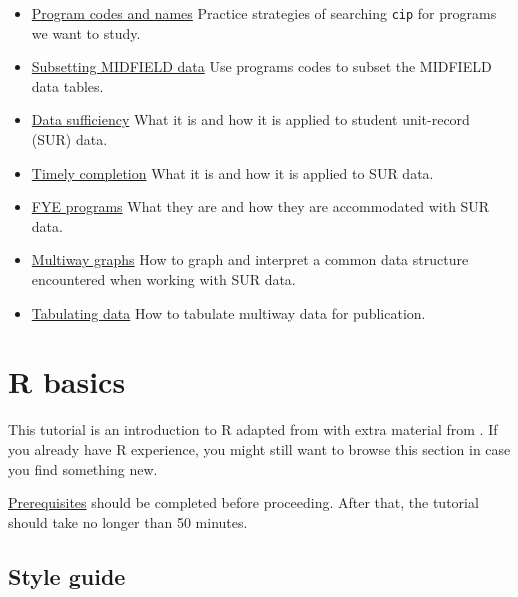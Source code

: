\documentclass[
]{book}
\providecommand{\tightlist}{%
  \setlength{\itemsep}{0pt}\setlength{\parskip}{0pt}}
\begin{document}
\begin{itemize}
\tightlist
\item
  \href{https://midfieldr.github.io/midfieldr/articles/art-010-program-codes.html}{Program codes and names} Practice strategies of searching \texttt{cip} for programs we want to study.
\item
  \href{https://midfieldr.github.io/midfieldr/articles/art-015-subsetting-midfield-data.html}{Subsetting MIDFIELD data} Use programs codes to subset the MIDFIELD data tables.
\item
  \href{https://midfieldr.github.io/midfieldr/articles/art-020-data-sufficiency.html}{Data sufficiency} What it is and how it is applied to student unit-record (SUR) data.
\item
  \href{https://midfieldr.github.io/midfieldr/articles/art-030-timely-completion.html}{Timely completion} What it is and how it is applied to SUR data.
\item
  \href{https://midfieldr.github.io/midfieldr/articles/art-040-fye-programs.html}{FYE programs} What they are and how they are accommodated with SUR data.
\item
  \href{https://midfieldr.github.io/midfieldr/articles/art-050-multiway-graphs.html}{Multiway graphs} How to graph and interpret a common data structure encountered when working with SUR data.
\item
  \href{https://midfieldr.github.io/midfieldr/articles/art-060-tabulating-data.html}{Tabulating data} How to tabulate multiway data for publication.
\end{itemize}

\hypertarget{r-basics}{%
\section{R basics}\label{r-basics}}

This tutorial is an introduction to R adapted from \citep{Healy:2019:Ch.2} with extra material from \citep{Matloff:2019}. If you already have R experience, you might still want to browse this section in case you find something new.

\protect\hyperlink{prerequisites}{Prerequisites} should be completed before proceeding. After that, the tutorial should take no longer than 50 minutes.

\hypertarget{style-guide}{%
\subsection{Style guide}\label{style-guide}}
\end{document}
